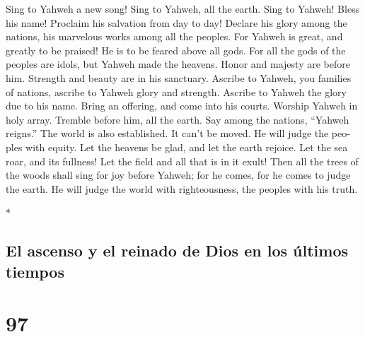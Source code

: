 \begin{paracol}{2}
\begin{otherlanguage}{english}
 Sing to Yahweh a new song! Sing to Yahweh, all the earth.
 Sing to Yahweh! Bless his name! Proclaim his salvation
from day to day!  Declare his glory among the nations, his
marvelous works among all the peoples.  For Yahweh is
great, and greatly to be praised! He is to be feared above all gods.
 For all the gods of the peoples are idols, but Yahweh
made the heavens.  Honor and majesty are before him.
Strength and beauty are in his sanctuary.  Ascribe to
Yahweh, you families of nations, ascribe to Yahweh glory and strength.
 Ascribe to Yahweh the glory due to his name. Bring an
offering, and come into his courts.  Worship Yahweh in
holy array. Tremble before him, all the earth.  Say among
the nations, ``Yahweh reigns.'' The world is also established. It can't
be moved. He will judge the peoples with equity.  Let the
heavens be glad, and let the earth rejoice. Let the sea roar, and its
fullness!  Let the field and all that is in it exult!
Then all the trees of the woods shall sing for joy 
before Yahweh; for he comes, for he comes to judge the earth. He will
judge the world with righteousness, the peoples with his truth.

\end{otherlanguage}

\switchcolumn[0]*

\hypertarget{el-ascenso-y-el-reinado-de-dios-en-los-uxfaltimos-tiempos}{%
\subsection{El ascenso y el reinado de Dios en los últimos
tiempos}\label{el-ascenso-y-el-reinado-de-dios-en-los-uxfaltimos-tiempos}}

\hypertarget{section-192}{%
\section{97}\label{section-192}}


\end{paracol}
